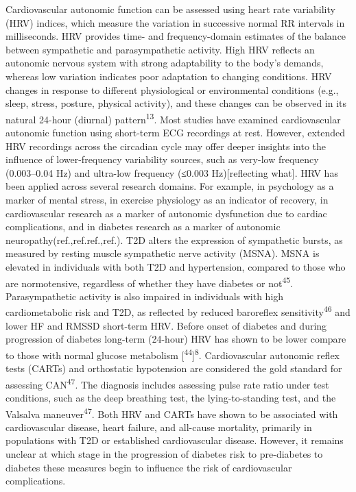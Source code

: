 \documentclass[
  a4paper,
  headsepline=true,
  open=any]{scrbook}
\begin{document}
Cardiovascular autonomic function can be assessed using heart rate
variability (HRV) indices, which measure the variation in successive
normal RR intervals in milliseconds. HRV provides time- and
frequency-domain estimates of the balance between sympathetic and
parasympathetic activity. High HRV reflects an autonomic nervous system
with strong adaptability to the body's demands, whereas low variation
indicates poor adaptation to changing conditions. HRV changes in
response to different physiological or environmental conditions (e.g.,
sleep, stress, posture, physical activity), and these changes can be
observed in its natural 24-hour (diurnal) pattern\textsuperscript{13}.
Most studies have examined cardiovascular autonomic function using
short-term ECG recordings at rest. However, extended HRV recordings
across the circadian cycle may offer deeper insights into the influence
of lower-frequency variability sources, such as very-low frequency
(0.003--0.04 Hz) and ultra-low frequency (≤0.003 Hz){[}reflecting
what{]}. HRV has been applied across several research domains. For
example, in psychology as a marker of mental stress, in exercise
physiology as an indicator of recovery, in cardiovascular research as a
marker of autonomic dysfunction due to cardiac complications, and in
diabetes research as a marker of autonomic
neuropathy(ref.,ref.ref.,ref.). T2D alters the expression of sympathetic
bursts, as measured by resting muscle sympathetic nerve activity (MSNA).
MSNA is elevated in individuals with both T2D and hypertension, compared
to those who are normotensive, regardless of whether they have diabetes
or not\textsuperscript{45}. Parasympathetic activity is also impaired in
individuals with high cardiometabolic risk and T2D, as reflected by
reduced baroreflex sensitivity\textsuperscript{46} and lower HF and
RMSSD short-term HRV. Before onset of diabetes and during progression of
diabetes long-term (24-hour) HRV has shown to be lower compare to those
with normal glucose metabolism
{[}\textsuperscript{44}{]}\textsuperscript{8}. Cardiovascular autonomic
reflex tests (CARTs) and orthostatic hypotension are considered the gold
standard for assessing CAN\textsuperscript{47}. The diagnosis includes
assessing pulse rate ratio under test conditions, such as the deep
breathing test, the lying-to-standing test, and the Valsalva
maneuver\textsuperscript{47}. Both HRV and CARTs have shown to be
associated with cardiovascular disease, heart failure, and all-cause
mortality, primarily in populations with T2D or established
cardiovascular disease. However, it remains unclear at which stage in
the progression of diabetes risk to pre-diabetes to diabetes these
measures begin to influence the risk of cardiovascular complications.
\end{document}
